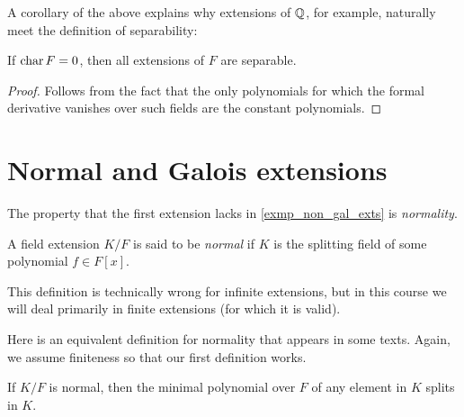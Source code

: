 A corollary of the above explains why extensions of $\mathbb{{Q}}$, for example, naturally meet the definition of separability:

\begin{corollary}
    If $\operatorname{char}{{F}} = 0$, then all extensions of $F$ are separable.
\end{corollary}

\begin{proof}
    Follows from the fact that the only polynomials for which the formal derivative vanishes over such fields are the constant polynomials.
\end{proof}

\section{Normal and Galois extensions}

The property that the first extension lacks in \cref{exmp_non_gal_exts} is \emph{normality}.

\begin{definition}
    A field extension $K/F$ is said to be \emph{normal} if $K$ is the splitting field of some polynomial $f \in F[x]$.
\end{definition}

\begin{remark}
    This definition is technically wrong for infinite extensions, but in this course we will deal primarily in finite extensions (for which it is valid).
\end{remark}

Here is an equivalent definition for normality that appears in some texts. Again, we assume finiteness so that our first definition works.

\begin{proposition}
\label{prop_normal_ext_min_polys_split}
    If $K/F$ is normal, then the minimal polynomial over $F$ of any element in $K$ splits in $K$.
\end{proposition}

